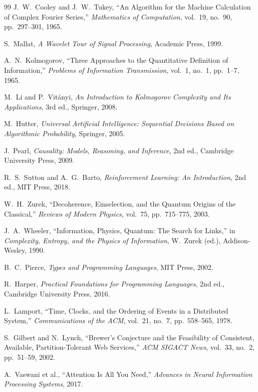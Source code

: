 \documentclass[12pt, a4paper]{article}
\theoremstyle{plain}
\theoremstyle{definition}
\theoremstyle{remark}
\begin{document}
\begin{thebibliography}{99}
J.~W.~Cooley and J.~W.~Tukey,
``An Algorithm for the Machine Calculation of Complex Fourier Series,''
\emph{Mathematics of Computation}, vol.~19, no.~90, pp.~297--301, 1965.

S.~Mallat,
\emph{A Wavelet Tour of Signal Processing},
Academic Press, 1999.

A.~N.~Kolmogorov,
``Three Approaches to the Quantitative Definition of Information,''
\emph{Problems of Information Transmission}, vol.~1, no.~1, pp.~1--7, 1965.

M.~Li and P.~Vit\'{a}nyi,
\emph{An Introduction to Kolmogorov Complexity and Its Applications},
3rd ed., Springer, 2008.

M.~Hutter,
\emph{Universal Artificial Intelligence: Sequential Decisions Based on Algorithmic Probability},
Springer, 2005.

J.~Pearl,
\emph{Causality: Models, Reasoning, and Inference},
2nd ed., Cambridge University Press, 2009.

R.~S.~Sutton and A.~G.~Barto,
\emph{Reinforcement Learning: An Introduction},
2nd ed., MIT Press, 2018.

W.~H.~Zurek,
``Decoherence, Einselection, and the Quantum Origins of the Classical,''
\emph{Reviews of Modern Physics}, vol.~75, pp.~715--775, 2003.

J.~A.~Wheeler,
``Information, Physics, Quantum: The Search for Links,''
in \emph{Complexity, Entropy, and the Physics of Information},
W.~Zurek (ed.), Addison-Wesley, 1990.

B.~C.~Pierce,
\emph{Types and Programming Languages},
MIT Press, 2002.

R.~Harper,
\emph{Practical Foundations for Programming Languages},
2nd ed., Cambridge University Press, 2016.

L.~Lamport,
``Time, Clocks, and the Ordering of Events in a Distributed System,''
\emph{Communications of the ACM}, vol.~21, no.~7, pp.~558--565, 1978.

S.~Gilbert and N.~Lynch,
``Brewer's Conjecture and the Feasibility of Consistent, Available, Partition-Tolerant Web Services,''
\emph{ACM SIGACT News}, vol.~33, no.~2, pp.~51--59, 2002.

A.~Vaswani et al.,
``Attention Is All You Need,''
\emph{Advances in Neural Information Processing Systems}, 2017.


\end{thebibliography}
\end{document}

